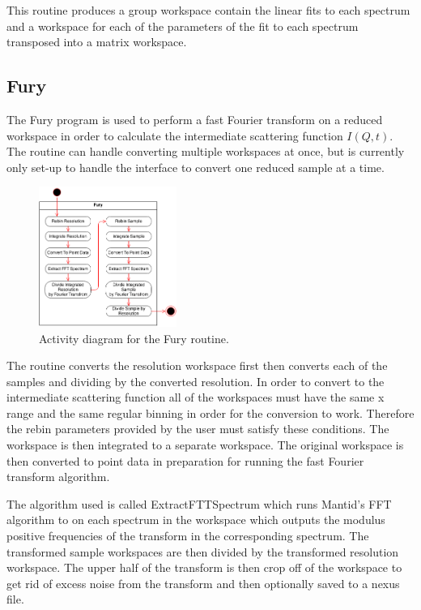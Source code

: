 \documentclass[paper=a4, fontsize=11pt]{scrartcl}	%
\numberwithin{equation}{section}															%
\numberwithin{figure}{section}																%
\numberwithin{table}{section}																%
\begin{document}
This routine produces a group workspace contain the linear fits to each spectrum and a workspace for each of the parameters of the fit to each spectrum transposed into a matrix workspace.

\subsection{Fury}
The Fury program is used to perform a fast Fourier transform on a reduced workspace in order to calculate the intermediate scattering function $I(Q,t)$. The routine can handle converting multiple workspaces at once, but is currently only set-up to handle the interface to convert one reduced sample at a time.

\begin{figure}[H]
\centering
\includegraphics[width=0.4\textwidth]{img/uml/activity_diagrams/Fury_activity.png}
\caption{Activity diagram for the Fury routine.}
\label{fig:instrument-energy-range}
\end{figure}


The routine converts the resolution workspace first then converts each of the samples and dividing by the converted resolution. In order to convert to the intermediate scattering function all of the workspaces must have the same x range and the same regular binning in order for the conversion to work. Therefore the rebin parameters provided by the user must satisfy these conditions. The workspace is then integrated to a separate workspace. The original workspace is then converted to point data in preparation for running the fast Fourier transform algorithm.

The algorithm used is called ExtractFTTSpectrum which runs Mantid's FFT algorithm to on each spectrum in the workspace which outputs the modulus positive frequencies of the transform in the corresponding spectrum. The transformed sample workspaces are then divided by the transformed resolution workspace. The upper half of the transform is then crop off of the workspace to get rid of excess noise from the transform and then optionally saved to a nexus file.
\end{document}
